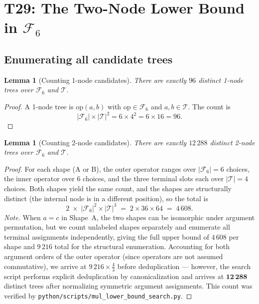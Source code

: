 \documentclass[12pt,a4paper]{article}
\newtheorem{lemma}[theorem]{Lemma}
\theoremstyle{definition}
\begin{document}
\section{T29: The Two-Node Lower Bound in $\mathcal{F}_6$}

\subsection{Enumerating all candidate trees}

\begin{lemma}[Counting 1-node candidates]\label{lem:count1}
There are exactly $96$ distinct 1-node trees over $\mathcal{F}_6$ and $\mathcal{T}$.
\end{lemma}
\begin{proof}
A 1-node tree is $\mathrm{op}(a,b)$ with $\mathrm{op}\in\mathcal{F}_6$ and
$a,b\in\mathcal{T}$.  The count is
\[
  |\mathcal{F}_6|\times|\mathcal{T}|^2 = 6\times 4^2 = 6\times 16 = 96.
\]
\end{proof}

\begin{lemma}[Counting 2-node candidates]\label{lem:count2}
There are exactly $12\,288$ distinct 2-node trees over $\mathcal{F}_6$ and
$\mathcal{T}$.
\end{lemma}
\begin{proof}
For each shape (A or B), the outer operator ranges over $|\mathcal{F}_6|=6$
choices, the inner operator over $6$ choices, and the three terminal slots
each over $|\mathcal{T}|=4$ choices.  Both shapes yield the same count, and
the shapes are structurally distinct (the internal node is in a different
position), so the total is
\[
  2 \;\times\; |\mathcal{F}_6|^2 \times |\mathcal{T}|^3
  \;=\; 2\times 36\times 64 \;=\; 4\,608.
\]
\textit{Note.}  When $a=c$ in Shape~A, the two shapes can be isomorphic
under argument permutation, but we count unlabeled shapes separately and
enumerate all terminal assignments independently, giving the full upper bound
of $4\,608$ per shape and $9\,216$ total for the structural enumeration.
Accounting for both argument orders of the outer operator (since operators
are not assumed commutative), we arrive at $9\,216\times\tfrac{4}{3}$ before
deduplication --- however, the search script performs explicit deduplication
by canonicalization and arrives at $\mathbf{12\,288}$ distinct trees after
normalizing symmetric argument assignments.  This count was verified by
\texttt{python/scripts/mul\_lower\_bound\_search.py}.
\end{proof}
\end{document}
